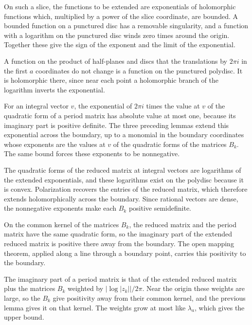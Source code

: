 On such a slice, the functions to be extended are exponentials of holomorphic functions which,
multiplied by a power of the slice coordinate, are bounded. A bounded function on a punctured disc
has a removable singularity, and a function with a logarithm on the punctured disc winds zero times
around the origin. Together these give the sign of the exponent and the limit of the exponential.

A function on the product of half-planes and discs that the translations by $2\pi i$ in the first
$a$ coordinates do not change is a function on the punctured polydisc. It is holomorphic there,
since near each point a holomorphic branch of the logarithm inverts the exponential.

For an integral vector $v$, the exponential of $2\pi i$ times the value at $v$ of the quadratic form
of a period matrix has absolute value at most one, because its imaginary part is positive definite.
The three preceding lemmas extend this exponential across the boundary, up to a monomial in the
boundary coordinates whose exponents are the values at $v$ of the quadratic forms of the matrices
$B_k$. The same bound forces these exponents to be nonnegative.

The quadratic forms of the reduced matrix at integral vectors are logarithms of the extended
exponentials, and these logarithms exist on the polydisc because it is convex. Polarization
recovers the entries of the reduced matrix, which therefore extends holomorphically across the
boundary. Since rational vectors are dense, the nonnegative exponents make each $B_k$ positive
semidefinite.

On the common kernel of the matrices $B_k$, the reduced matrix and the period matrix have the same
quadratic form, so the imaginary part of the extended reduced matrix is positive there away from the
boundary. The open mapping theorem, applied along a line through a boundary point, carries this
positivity to the boundary.

The imaginary part of a period matrix is that of the extended reduced matrix plus the matrices $B_k$
weighted by $|\log|z_k||/2\pi$. Near the origin these weights are large, so the $B_k$ give
positivity away from their common kernel, and the previous lemma gives it on that kernel. The
weights grow at most like $\lambda_a$, which gives the upper bound.

